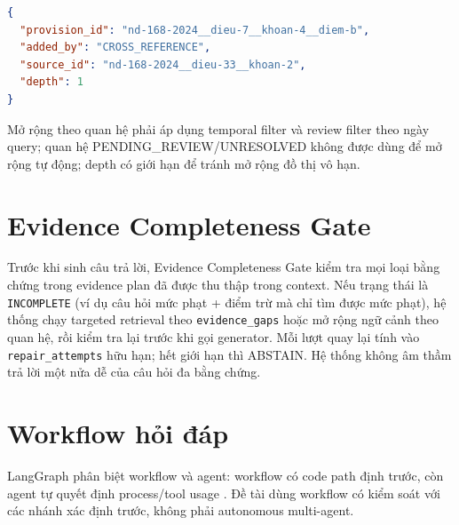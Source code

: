 \documentclass[a4paper,12pt]{extreport}
\newcommand{\code}[1]{\texttt{#1}}
\begin{document}
\begin{lstlisting}[language=json,caption={Metadata của provision được mở rộng}]
{
  "provision_id": "nd-168-2024__dieu-7__khoan-4__diem-b",
  "added_by": "CROSS_REFERENCE",
  "source_id": "nd-168-2024__dieu-33__khoan-2",
  "depth": 1
}
\end{lstlisting}

Mở rộng theo quan hệ phải áp dụng temporal filter và review filter theo ngày query; quan hệ PENDING\_REVIEW/UNRESOLVED không được dùng để mở rộng tự động; depth có giới hạn để tránh mở rộng đồ thị vô hạn.

\section{Evidence Completeness Gate}

Trước khi sinh câu trả lời, Evidence Completeness Gate kiểm tra mọi loại bằng chứng trong evidence plan đã được thu thập trong context. Nếu trạng thái là \code{INCOMPLETE} (ví dụ câu hỏi mức phạt + điểm trừ mà chỉ tìm được mức phạt), hệ thống chạy targeted retrieval theo \code{evidence\_gaps} hoặc mở rộng ngữ cảnh theo quan hệ, rồi kiểm tra lại trước khi gọi generator. Mỗi lượt quay lại tính vào \code{repair\_attempts} hữu hạn; hết giới hạn thì ABSTAIN. Hệ thống không âm thầm trả lời một nửa dễ của câu hỏi đa bằng chứng.

\section{Workflow hỏi đáp}

LangGraph phân biệt workflow và agent: workflow có code path định trước, còn agent tự quyết định process/tool usage \cite{langgraph2026workflows}. Đề tài dùng workflow có kiểm soát với các nhánh xác định trước, không phải autonomous multi-agent.
\end{document}
